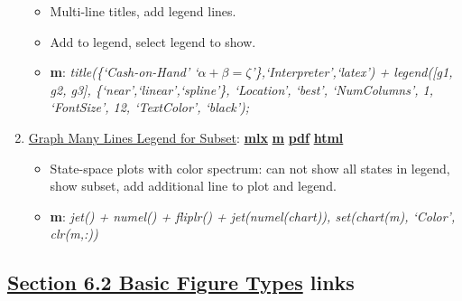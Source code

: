 \documentclass[
]{book}
\providecommand{\tightlist}{%
  \setlength{\itemsep}{0pt}\setlength{\parskip}{0pt}}
\begin{document}
\begin{enumerate}
  \begin{itemize}
  \tightlist
  \item
    Multi-line titles, add legend lines.
  \item
    Add to legend, select legend to show.
  \item
    \textbf{m}: \emph{title(\{`Cash-on-Hand' `\(\alpha + \beta = \zeta\)'\},`Interpreter',`latex') + legend({[}g1, g2, g3{]}, \{`near',`linear',`spline'\}, `Location', `best', `NumColumns', 1, `FontSize', 12, `TextColor', `black');}
  \end{itemize}
\item
  \href{https://fanwangecon.github.io/M4Econ/graph/tools/htmlpdfm/fs_legendsubset.html}{Graph Many Lines Legend for Subset}: \href{https://github.com/FanWangEcon/M4Econ/blob/master/graph/tools/fs_legendsubset.mlx}{\textbf{mlx}} \textbar{} \href{https://github.com/FanWangEcon/M4Econ/blob/master/graph/tools/htmlpdfm/fs_legendsubset.m}{\textbf{m}} \textbar{} \href{https://github.com/FanWangEcon/M4Econ/blob/master/graph/tools/htmlpdfm/fs_legendsubset.pdf}{\textbf{pdf}} \textbar{} \href{https://fanwangecon.github.io/M4Econ/graph/tools/htmlpdfm/fs_legendsubset.html}{\textbf{html}}

  \begin{itemize}
  \tightlist
  \item
    State-space plots with color spectrum: can not show all states in legend, show subset, add additional line to plot and legend.
  \item
    \textbf{m}: \emph{jet() + numel() + fliplr() + jet(numel(chart)), set(chart(m), `Color', clr(m,:))}
  \end{itemize}
\end{enumerate}

\hypertarget{section-6.2-basic-figure-typesbasic-figure-types-links}{%
\subsection{\texorpdfstring{\protect\hyperlink{basic-figure-types}{Section 6.2 Basic Figure Types} links}{Section 6.2 Basic Figure Types links}}\label{section-6.2-basic-figure-typesbasic-figure-types-links}}
\end{document}
